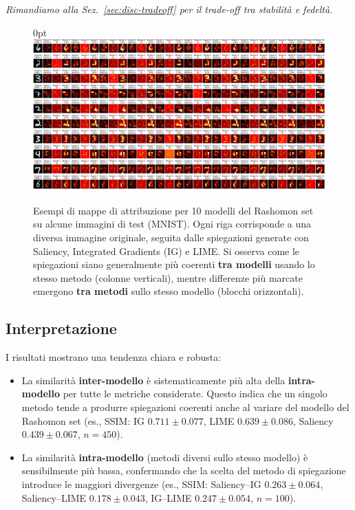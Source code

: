 \documentclass[12pt,a4paper,oneside]{report}
\numberwithin{figure}{chapter}
\numberwithin{table}{chapter}
\newenvironment{figindent}[1][\parindent]{%
  \begin{figure}[H]\begin{adjustwidth}{#1}{0pt}\centering}{%
  \end{adjustwidth}\end{figure}}
\begin{document}
{\small \textit{Rimandiamo alla Sez.~\ref{sec:disc-tradeoff} per il trade-off tra stabilità e fedeltà.}}


\begin{figindent}
      \centering
      \includegraphics[width=\textwidth]{images/visualizzazione (2).png}
      \caption{Esempi di mappe di attribuzione per 10 modelli del Rashomon set su alcune immagini di test (MNIST).
            Ogni riga corrisponde a una diversa immagine originale, seguita dalle spiegazioni generate con Saliency, Integrated Gradients (IG) e LIME.
            Si osserva come le spiegazioni siano generalmente più coerenti \textbf{tra modelli} usando lo stesso metodo (colonne verticali),
            mentre differenze più marcate emergono \textbf{tra metodi} sullo stesso modello (blocchi orizzontali).}
      \label{fig:similarity_examples}
\end{figindent}

\subsection{Interpretazione}
I risultati mostrano una tendenza chiara e robusta:
\begin{itemize}
      \item La similarità \textbf{inter-modello} è sistematicamente più alta della
            \textbf{intra-modello} per tutte le metriche considerate. Questo indica che un
            singolo metodo tende a produrre spiegazioni coerenti anche al variare del
            modello del Rashomon set (es., SSIM: IG $0.711 \pm 0.077$, LIME $0.639 \pm
                  0.086$, Saliency $0.439 \pm 0.067$, $n=450$).
      \item La similarità \textbf{intra-modello} (metodi diversi sullo stesso modello) è
            sensibilmente più bassa, confermando che la scelta del metodo di spiegazione
            introduce le maggiori divergenze (es., SSIM: Saliency--IG $0.263 \pm 0.064$,
            Saliency--LIME $0.178 \pm 0.043$, IG--LIME $0.247 \pm 0.054$, $n=100$).
\end{itemize}
\end{document}
